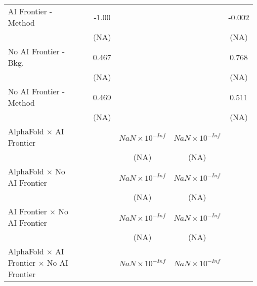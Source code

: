 \begin{tabular}{lcccccc}
   AI Frontier - Method                                                       &               &        & -1.00  &                        &                        & -0.002\\   
                                                                              &               &        & (NA)   &                        &                        & (NA)\\   
   No AI Frontier - Bkg.                                                      &               &        & 0.467  &                        &                        & 0.768\\   
                                                                              &               &        & (NA)   &                        &                        & (NA)\\   
   No AI Frontier - Method                                                    &               &        & 0.469  &                        &                        & 0.511\\   
                                                                              &               &        & (NA)   &                        &                        & (NA)\\   
   AlphaFold $\times$ AI Frontier                                             &               &        &        & $NaN\times 10^{-Inf}$  & $NaN\times 10^{-Inf}$  &   \\   
                                                                              &               &        &        & (NA)                   & (NA)                   &   \\   
   AlphaFold $\times$ No AI Frontier                                          &               &        &        & $NaN\times 10^{-Inf}$  & $NaN\times 10^{-Inf}$  &   \\   
                                                                              &               &        &        & (NA)                   & (NA)                   &   \\   
   AI Frontier $\times$ No AI Frontier                                        &               &        &        & $NaN\times 10^{-Inf}$  & $NaN\times 10^{-Inf}$  &   \\   
                                                                              &               &        &        & (NA)                   & (NA)                   &   \\   
   AlphaFold $\times$ AI Frontier $\times$ No AI Frontier                     &               &        &        & $NaN\times 10^{-Inf}$  & $NaN\times 10^{-Inf}$  &   \\   

\end{tabular}
